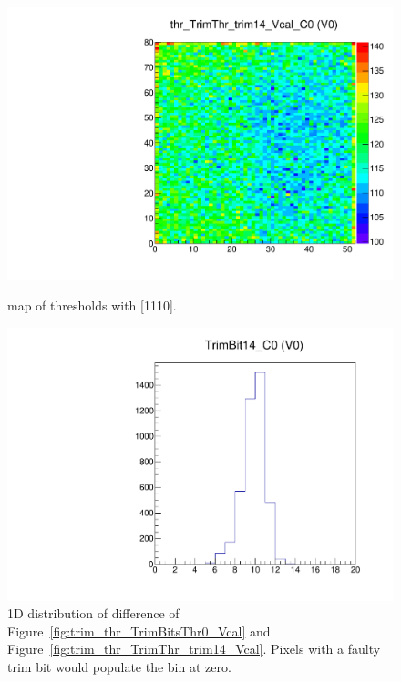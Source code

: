 \begin{figure}[!htp]
\centering
\begin{minipage}{0.45\textwidth}
  \includegraphics[width=1.0\textwidth]{figures/trim_thr_TrimThr_trim14_Vcal.pdf}
  \caption{\roc map of \vcal thresholds with  [1110].}
  \label{fig:trim_thr_TrimThr_trim14_Vcal}
\end{minipage}
\hspace{0.3cm}
\begin{minipage}{0.45\textwidth}
  \includegraphics[width=1.0\textwidth]{figures/trim_TrimBit14.pdf}
  \caption{1D distribution of difference of Figure~\ref{fig:trim_thr_TrimBitsThr0_Vcal} and Figure~\ref{fig:trim_thr_TrimThr_trim14_Vcal}.
           Pixels with a faulty trim bit would populate the bin at zero.}
  \label{fig:trim_TrimBit14}
\end{minipage}
\end{figure}

